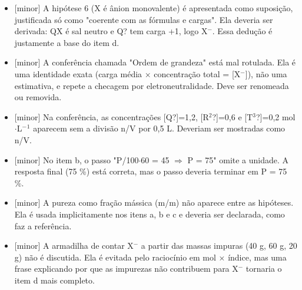 \documentclass{article}%
\begin{document}
\begin{itemize}%
\item%
{[}minor{]} A hipótese 6 (X é ânion monovalente) é apresentada como suposição, justificada só como "coerente com as fórmulas e cargas". Ela deveria ser derivada: QX é sal neutro e Q? tem carga +1, logo X$^{-}$. Essa dedução é justamente a base do item d.%
\item%
{[}minor{]} A conferência chamada "Ordem de grandeza" está mal rotulada. Ela é uma identidade exata (carga média $\times$ concentração total = {[}X$^{-}${]}), não uma estimativa, e repete a checagem por eletroneutralidade. Deve ser renomeada ou removida.%
\item%
{[}minor{]} Na conferência, as concentrações {[}Q?{]}=1,2, {[}R$^2$?{]}=0,6 e {[}T$^3$?{]}=0,2 mol$\cdot$L$^{-}$$^{1}$ aparecem sem a divisão n/V por 0,5 L. Deveriam ser mostradas como n/V.%
\item%
{[}minor{]} No item b, o passo "P/100$\cdot$60 = 45 $\Rightarrow$ P = 75" omite a unidade. A resposta final (75 \%) está correta, mas o passo deveria terminar em P = 75 \%.%
\item%
{[}minor{]} A pureza como fração mássica (m/m) não aparece entre as hipóteses. Ela é usada implicitamente nos itens a, b e c e deveria ser declarada, como faz a referência.%
\item%
{[}minor{]} A armadilha de contar X$^{-}$ a partir das massas impuras (40 g, 60 g, 20 g) não é discutida. Ela é evitada pelo raciocínio em mol $\times$ índice, mas uma frase explicando por que as impurezas não contribuem para X$^{-}$ tornaria o item d mais completo.%
\end{itemize}%
\end{document}
